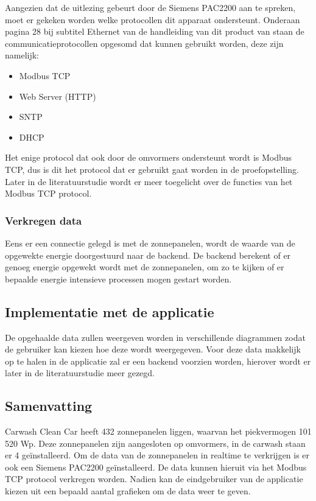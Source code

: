 Aangezien dat de uitlezing gebeurt door de Siemens PAC2200 aan te spreken, moet er gekeken worden welke protocollen dit apparaat ondersteunt. Onderaan pagina 28 bij subtitel Ethernet van de handleiding van dit product van \textcite{Siemens2022} staan de communicatieprotocollen opgesomd dat kunnen gebruikt worden, deze zijn namelijk:

\begin{itemize}
    \item Modbus TCP
    \item Web Server (HTTP)
    \item SNTP
    \item DHCP
\end{itemize}

Het enige protocol dat ook door de omvormers ondersteunt wordt is Modbus TCP, dus is dit het protocol dat er gebruikt gaat worden in de proefopstelling. Later in de literatuurstudie wordt er meer toegelicht over de functies van het Modbus TCP protocol.

\subsubsection{Verkregen data}
\label{sec:stand-van-zaken-zonnepanelen-verkregen-data}

Eens er een connectie gelegd is met de zonnepanelen, wordt de waarde van de opgewekte energie doorgestuurd naar de backend. De backend berekent of er genoeg energie opgewekt wordt met de zonnepanelen, om zo te kijken of er bepaalde energie intensieve processen mogen gestart worden.

\subsection{Implementatie met de applicatie}

De opgehaalde data zullen weergeven worden in verschillende diagrammen zodat de gebruiker kan kiezen hoe deze wordt weergegeven. Voor deze data makkelijk op te halen in de applicatie zal er een backend voorzien worden, hierover wordt er later in de literatuurstudie meer gezegd.

\subsection{Samenvatting}
\label{sec:stand-van-zaken-zonnepanelen-samenvatting}

Carwash Clean Car heeft 432 zonnepanelen liggen, waarvan het piekvermogen 101 520 Wp. Deze zonnepanelen zijn aangesloten op omvormers, in de carwash staan er 4 geïnstalleerd. Om de data van de zonnepanelen in realtime te verkrijgen is er ook een Siemens PAC2200 geïnstalleerd. De data kunnen hieruit via het Modbus TCP protocol verkregen worden. Nadien kan de eindgebruiker van de applicatie kiezen uit een bepaald aantal grafieken om de data weer te geven.

